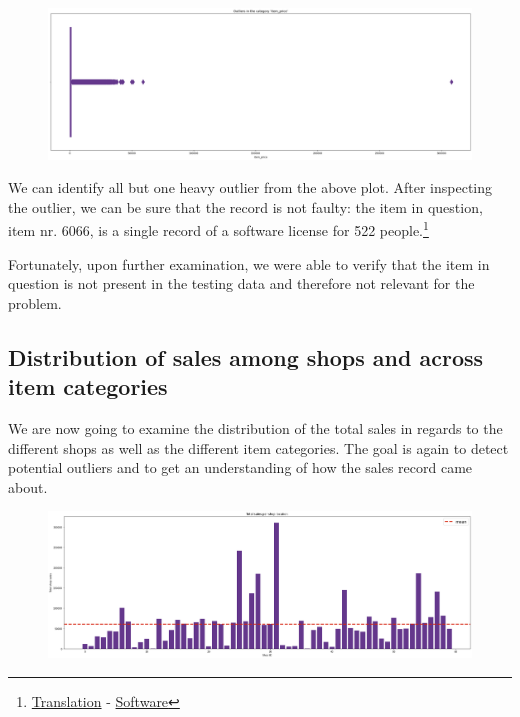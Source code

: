 \begin{figure}[h]
  \centering
  \includegraphics[width=0.82\linewidth]{external_content/graphs/outliers-item_price.png}
  \captionsetup{justification=centering}
  \label{fig:item_price_outliers}
\end{figure}

We can identify all but one heavy outlier from the above plot. After inspecting the outlier, we can be sure that the record is not faulty: the item in question, item nr. 6066, is a single record of a software license for 522 people.\footnote{\href{https://translate.google.com/?sl=ru&tl=en&text=Radmin\%203\%20\%20-\%20522\%20\%D0\%BB\%D0\%B8\%D1\%86.&op=translate }{Translation} - \href{https://www.radmin.com/ordering/}{Software}}

Fortunately, upon further examination, we were able to verify that the item in question is not present in the testing data and therefore not relevant for the problem.

\subsection{Distribution of sales among shops and across item categories}

We are now going to examine the distribution of the total sales in regards to the different shops as well as the different item categories. The goal is again to detect potential outliers and to get an understanding of how the sales record came about.

\begin{figure}[h]
  \centering
  \includegraphics[width=0.82\linewidth]{external_content/graphs/distribution_amongst_shops.png}
  \captionsetup{justification=centering}
  \label{fig:distribution_amongst_shops}
\end{figure}

